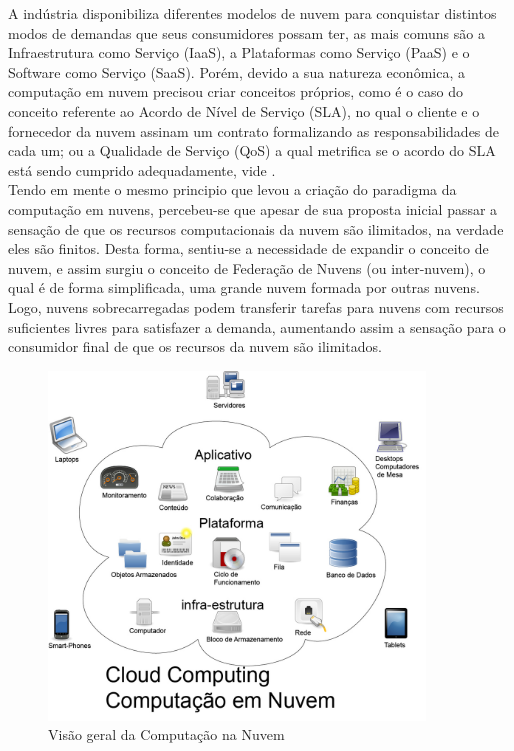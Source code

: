 A indústria disponibiliza diferentes modelos de nuvem para conquistar distintos modos de demandas que seus consumidores possam ter, as mais comuns são a Infraestrutura como Serviço (IaaS), a Plataformas como Serviço (PaaS) e o Software como Serviço (SaaS). Porém, devido a sua natureza econômica, a computação em nuvem precisou criar conceitos próprios, como é o caso do conceito referente ao Acordo de Nível de Serviço (SLA), no qual o cliente e o fornecedor da nuvem assinam um contrato formalizando as responsabilidades de cada um; ou a Qualidade de Serviço (QoS) a qual metrifica se o acordo do SLA está sendo cumprido adequadamente, vide \cite{buyya2}. \\

Tendo em mente o mesmo principio que levou a criação do paradigma da computação em nuvens, percebeu-se que apesar de sua proposta inicial passar a sensação de que os recursos computacionais da nuvem são ilimitados, na verdade eles são finitos. Desta forma, sentiu-se a necessidade de expandir o conceito de nuvem, e assim surgiu o conceito de Federação de Nuvens (ou inter-nuvem), o qual é de forma simplificada, uma grande nuvem formada por outras nuvens. Logo, nuvens sobrecarregadas podem transferir tarefas para nuvens com recursos suficientes livres para satisfazer a demanda, aumentando assim a sensação para o consumidor final de que os recursos da nuvem são ilimitados. \\

\begin{figure}[htb]
	\begin{center}
		
		\includegraphics[clip,width=10.0cm]{images/image3.jpg}
		\caption{Visão geral da Computação na Nuvem}
		\label{fig:image3}
	\end{center}
\end{figure}

